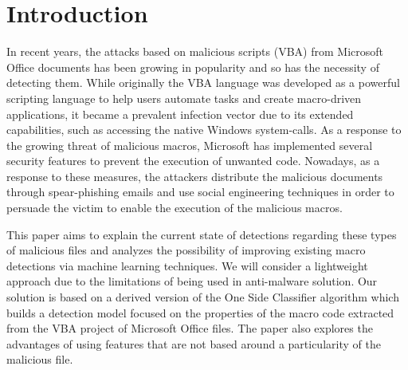 \section{Introduction}
In recent years, the attacks based on malicious scripts (VBA) from Microsoft Office documents has been growing in popularity and so has the necessity of detecting them. While originally the VBA language was developed as a powerful scripting language to help users automate tasks and create macro-driven applications, it became a prevalent infection vector due to its extended capabilities, such as accessing the native Windows system-calls. As a response to the growing threat of malicious macros, Microsoft has implemented several security features to prevent the execution of unwanted code. Nowadays, as a response to these measures, the attackers distribute the malicious documents through spear-phishing emails and use social engineering techniques in order to persuade the victim to enable the execution of the malicious macros.
\par
This paper aims to explain the current state of detections regarding these types of malicious files and analyzes the possibility of improving existing macro detections via machine learning techniques. We will consider a lightweight approach due to the limitations of being used in anti-malware solution. Our solution is based on a derived version of the One Side Classifier algorithm which builds a detection model focused on the properties of the macro code extracted from the VBA project of Microsoft Office files. The paper also explores the advantages of using features that are not based around a particularity of the malicious file.
